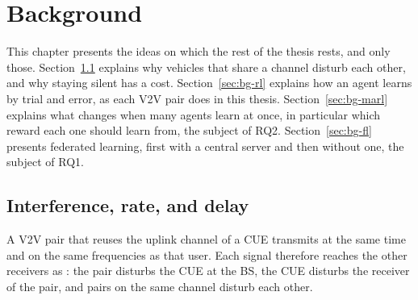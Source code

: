 \chapter{Background}
\label{chap:background}

This chapter presents the ideas on which the rest of the thesis rests, and only those.
Section~\ref{sec:bg-v2v} explains why vehicles that share a channel disturb each other, and why staying
silent has a cost. Section~\ref{sec:bg-rl} explains how an agent learns by trial and error, as each \ac{V2V}
pair does in this thesis. Section~\ref{sec:bg-marl} explains what changes when many agents learn at once, in particular which
reward each one should learn from, the subject of RQ2. Section~\ref{sec:bg-fl} presents federated learning,
first with a central server and then without one, the subject of RQ1.

\section{Interference, rate, and delay}
\label{sec:bg-v2v}

A \ac{V2V} pair that reuses the uplink channel of a \ac{CUE} transmits at the same time and on the same
frequencies as that user. Each signal therefore reaches the other receivers as : the
pair disturbs the \ac{CUE} at the \ac{BS}, the \ac{CUE} disturbs the receiver of the pair, and pairs on the
same channel disturb each other.

